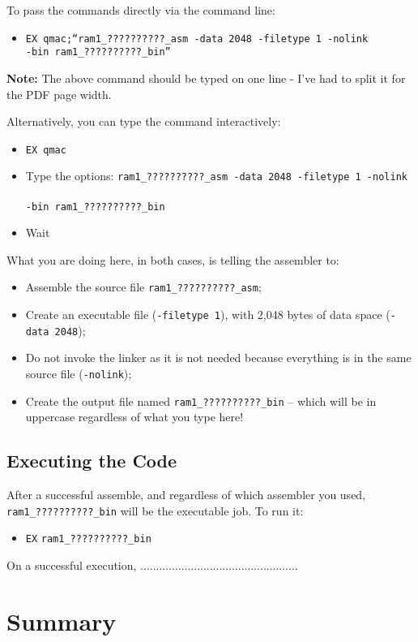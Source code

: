 To pass the commands directly via the command line:
\begin{itemize}
\item \texttt{EX qmac;``ram1\_??????????\_asm -data 2048 -filetype 1 -nolink
}~\\
\texttt{-bin ram1\_??????????\_bin''}
\end{itemize}
\textbf{Note:} The above command should be typed on one line - I've
had to split it for the PDF page width. 

Alternatively, you can type the command interactively:
\begin{itemize}
\item \texttt{EX qmac}
\item Type the options: \texttt{ram1\_??????????\_asm -data 2048 -filetype
1 -nolink }~\\
\texttt{-bin ram1\_??????????\_bin}
\item Wait
\end{itemize}
What you are doing here, in both cases, is telling the assembler to:
\begin{itemize}
\item Assemble the source file \texttt{ram1\_??????????\_asm};
\item Create an executable file (\texttt{-filetype 1}), with 2,048 bytes
of data space (\texttt{-data 2048});
\item Do not invoke the linker as it is not needed because everything is
in the same source file (\texttt{-nolink});
\item Create the output file named \texttt{ram1\_??????????\_bin} -- which
will be in uppercase regardless of what you type here!
\end{itemize}

\subsection{Executing the Code}

After a successful assemble, and regardless of which assembler you
used, \texttt{ram1\_??????????\_bin} will be the executable job. To
run it:
\begin{itemize}
\item \texttt{EX} \texttt{ram1\_??????????\_bin}
\end{itemize}
On a successful execution, ..................................................

\section{Summary}

